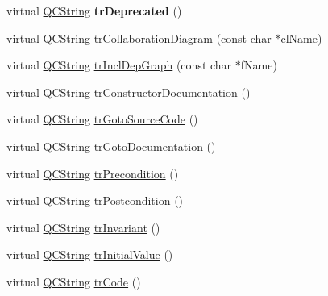 \begin{DoxyCompactItemize}
\item 
\mbox{\label{class_translator_japanese_a32428e29aaea6e4fb5c43beb478d5de0}} 
virtual \mbox{\hyperlink{class_q_c_string}{Q\+C\+String}} {\bfseries tr\+Deprecated} ()
\item 
virtual \mbox{\hyperlink{class_q_c_string}{Q\+C\+String}} \mbox{\hyperlink{class_translator_japanese_ac4cd190f2bc3f4fbf989a9ef0108ad2d}{tr\+Collaboration\+Diagram}} (const char $\ast$cl\+Name)
\item 
virtual \mbox{\hyperlink{class_q_c_string}{Q\+C\+String}} \mbox{\hyperlink{class_translator_japanese_afd8ab3f0b6b1abdfd6af112f31ec4354}{tr\+Incl\+Dep\+Graph}} (const char $\ast$f\+Name)
\item 
virtual \mbox{\hyperlink{class_q_c_string}{Q\+C\+String}} \mbox{\hyperlink{class_translator_japanese_ad0c8515f91e3f7b545411d5e0d771cbb}{tr\+Constructor\+Documentation}} ()
\item 
virtual \mbox{\hyperlink{class_q_c_string}{Q\+C\+String}} \mbox{\hyperlink{class_translator_japanese_a22a29bc4bb4e274586b19b8412906384}{tr\+Goto\+Source\+Code}} ()
\item 
virtual \mbox{\hyperlink{class_q_c_string}{Q\+C\+String}} \mbox{\hyperlink{class_translator_japanese_a5bff5a3ad64b157e71b5dfa39b7643c5}{tr\+Goto\+Documentation}} ()
\item 
virtual \mbox{\hyperlink{class_q_c_string}{Q\+C\+String}} \mbox{\hyperlink{class_translator_japanese_a79d08f0f287feb495aae81306185ac54}{tr\+Precondition}} ()
\item 
virtual \mbox{\hyperlink{class_q_c_string}{Q\+C\+String}} \mbox{\hyperlink{class_translator_japanese_ab4a35f62a710fe919436c217ba9b949a}{tr\+Postcondition}} ()
\item 
virtual \mbox{\hyperlink{class_q_c_string}{Q\+C\+String}} \mbox{\hyperlink{class_translator_japanese_ad4cd27f745b3a8024d8c2886a9df93fd}{tr\+Invariant}} ()
\item 
virtual \mbox{\hyperlink{class_q_c_string}{Q\+C\+String}} \mbox{\hyperlink{class_translator_japanese_af932b07c746cf4b8a41ba1a0bccd0a4a}{tr\+Initial\+Value}} ()
\item 
virtual \mbox{\hyperlink{class_q_c_string}{Q\+C\+String}} \mbox{\hyperlink{class_translator_japanese_a430df42a03c1679e583994d57c7c0962}{tr\+Code}} ()
\item 
\mbox{\label{class_translator_japanese_ad768b8498fa024b0a076455334a79f09}} 

\end{DoxyCompactItemize}

